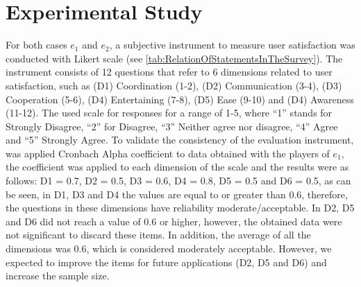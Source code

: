 \documentclass[conference]{./sty/IEEEtran}
\begin{document}
\section{Experimental Study} 
\label{sec:study}

For both cases $e_1$ and $e_2$, a subjective instrument to measure user satisfaction was conducted with Likert scale (see \ref{tab:RelationOfStatementsInTheSurvey}). The instrument consists of 12 questions that refer to 6 dimensions related to user satisfaction, such as (D1) Coordination (1-2), (D2) Communication (3-4), (D3) Cooperation (5-6), (D4) Entertaining (7-8), (D5) Ease (9-10) and (D4) Awareness (11-12). The used scale for responses for a range of 1-5, where ``1'' stands for Strongly Disagree, ``2'' for Disagree, ``3'' Neither agree nor disagree, ``4'' Agree and ``5'' Strongly Agree. To validate the consistency of the evaluation instrument, was applied Cronbach Alpha coefficient to data obtained with the players of $e_1$, the coefficient was applied to each dimension of the scale and the results were as follows: D1 = 0.7, D2 = 0.5, D3 = 0.6, D4 = 0.8, D5 = 0.5 and D6 = 0.5, as can be seen, in D1, D3 and D4 the values are equal to or greater than 0.6, therefore, the questions in these dimensions have reliability moderate/acceptable. In D2, D5 and D6 did not reach a value of 0.6 or higher, however, the obtained data were not significant to discard these items. In addition, the average of all the dimensions was 0.6, which is considered moderately acceptable. However, we expected to improve the items for future applications (D2, D5 and D6) and increase the sample size.
\end{document}
